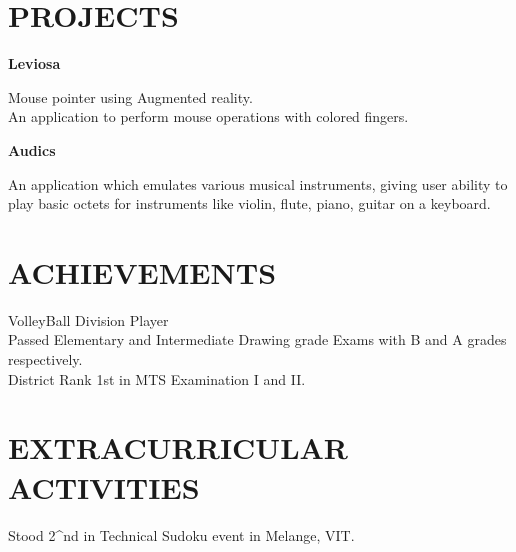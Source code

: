 \documentclass{res}
\begin{document}
\begin{resume}
\section{PROJECTS}
   \vspace{-0.1in}	
   \begin{tabbing}
    {\bf Leviosa}
   \end{tabbing}\vspace{-20pt}      %
    Mouse pointer using Augmented reality.\\An application to perform mouse operations with colored fingers.
   \begin{tabbing}
    {\bf Audics}
   \end{tabbing}\vspace{-20pt}
    An application which emulates various musical instruments, giving user ability to play basic octets for instruments like violin, flute, piano, guitar on a keyboard.
          
\section{ACHIEVEMENTS}
	VolleyBall Division Player\\          
	Passed Elementary and Intermediate Drawing grade Exams with B and A grades respectively.\\
	District Rank 1st in MTS Examination I and II.\\              
 
\section{EXTRACURRICULAR ACTIVITIES}          
Stood 2^{nd} in Technical Sudoku event in Melange, VIT.
 
\end{resume}
\end{document}
